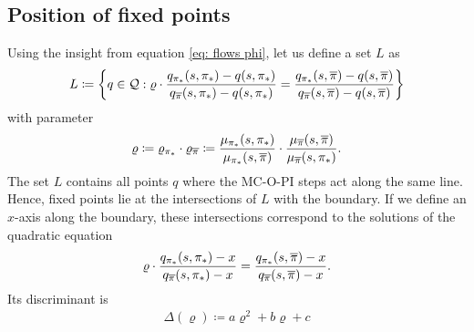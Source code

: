 \subsection{Position of fixed points}



Using the insight from equation \eqref{eq: flows phi}, let us define a set $L$ as
\begin{align}
    L 
    \coloneqq 
    \bigg\{ q \in \mathcal{Q} :  
    \varrho \cdot 
    \dfrac{q_{{\pi}_*}(s, {\pi}_*)-q(s, {\pi}_*)}{q_{\overline{\pi}}(s, {\pi}_*)-q(s, {\pi}_*)}
    =
    \dfrac{q_{{\pi}_*}(s, \overline{\pi})-q(s, \overline{\pi})}{q_{\overline{\pi}}(s, \overline{\pi})-q(s, \overline{\pi})}
    \bigg\}
\end{align}
with parameter
\begin{align}
\label{eq: definition parameters of bifurcation}
    \varrho
    \coloneqq \varrho_{{\pi}_*} 
    \cdot 
    \varrho_{\overline{\pi}}
    \coloneqq \dfrac{\mu_{{\pi}_*}(s, {\pi}_*)}{\mu_{{\pi}_*} (s, \overline{\pi})} 
    \cdot
    \dfrac{\mu_{\overline{\pi}}(s, \overline{\pi})}{\mu_{\overline{\pi}}(s, {\pi}_*)}
    .
\end{align}
The set $L$ contains all points $q$ where the MC-O-PI steps act along the same line. Hence, fixed points lie at the intersections of $L$ with the boundary.
If we define an $x$-axis along the boundary, these intersections correspond to the solutions of the quadratic equation
\begin{align}
\label{eq: quadratic for fixed points}
    \varrho \cdot 
    \dfrac{q_{{\pi}_*}(s, {\pi}_*) - x}{q_{\overline{\pi}}(s, {\pi}_*) - x}
    =
    \dfrac{q_{{\pi}_*}(s, \overline{\pi}) - x}{q_{\overline{\pi}}(s, \overline{\pi}) - x} .
\end{align}
Its discriminant is
\begin{align}
\label{eq: discriminant}
    \Delta(\varrho) 
    \coloneqq a \varrho^2 + b \varrho + c
\end{align}
